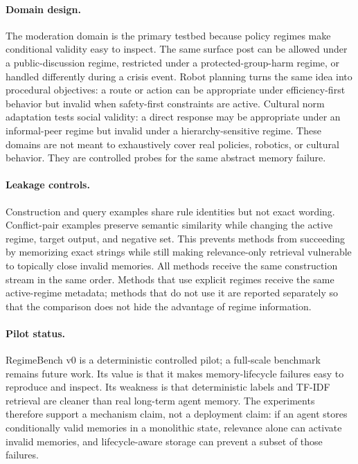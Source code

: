 \documentclass{article} %
\begin{document}
\paragraph{Domain design.}
The moderation domain is the primary testbed because policy regimes make conditional validity easy to inspect.
The same surface post can be allowed under a public-discussion regime, restricted under a protected-group-harm regime, or handled differently during a crisis event.
Robot planning turns the same idea into procedural objectives: a route or action can be appropriate under efficiency-first behavior but invalid when safety-first constraints are active.
Cultural norm adaptation tests social validity: a direct response may be appropriate under an informal-peer regime but invalid under a hierarchy-sensitive regime.
These domains are not meant to exhaustively cover real policies, robotics, or cultural behavior.
They are controlled probes for the same abstract memory failure.

\paragraph{Leakage controls.}
Construction and query examples share rule identities but not exact wording.
Conflict-pair examples preserve semantic similarity while changing the active regime, target output, and negative set.
This prevents methods from succeeding by memorizing exact strings while still making relevance-only retrieval vulnerable to topically close invalid memories.
All methods receive the same construction stream in the same order.
Methods that use explicit regimes receive the same active-regime metadata; methods that do not use it are reported separately so that the comparison does not hide the advantage of regime information.

\paragraph{Pilot status.}
RegimeBench v0 is a deterministic controlled pilot; a full-scale benchmark remains future work.
Its value is that it makes memory-lifecycle failures easy to reproduce and inspect.
Its weakness is that deterministic labels and TF-IDF retrieval are cleaner than real long-term agent memory.
The experiments therefore support a mechanism claim, not a deployment claim: if an agent stores conditionally valid memories in a monolithic state, relevance alone can activate invalid memories, and lifecycle-aware storage can prevent a subset of those failures.
\end{document}
